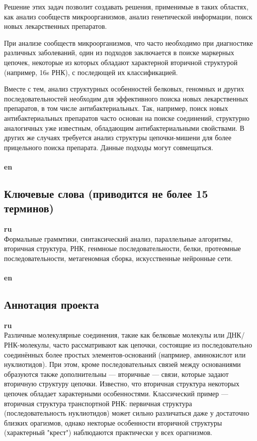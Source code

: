 ﻿\documentclass[12pt]{article}  %
\theoremstyle{remark}
\begin{document}
Решение этих задач позволит создавать решения, применимые в таких областях, как анализ сообществ микроорганизмов, анализ генетической информации, поиск новых лекарственных препаратов.

При анализе сообществ микроорганизмов, что часто необходимо при диагностике различных заболеваний, один из подходов заключается в поиске маркерных цепочек, некоторые из которых обладают характерной вторичной структурой (например, 16s РНК), с последющей их классификацией.

Вместе с тем, анализ структурных особенностей белковых, геномных и других последовательностей необходим для эффективного поиска новых лекарственных препаратов, в том числе антибактериальных. Так, например, поиск новых антибактериальных препаратов часто основан на поиске соединений, структурно аналогичных уже известным, обладающим антибактериальными свойствами. В других же случаях требуется анализ структуры цепочки-мишени для более прицельного поиска препарата. Данные подходы могут совмещаться.
\\
\\
\textbf{en}\\


\subsection{Ключевые слова (приводится не более 15 терминов)}

\textbf{ru}\\
Формальные граммтики, синтаксический анализ, параллельные алгоритмы, вторичная структура, РНК, генмноые последовательности, белки, протеомные последовательности, метагеномная сборка, искусственные нейронные сети.
\\
\\
\textbf{en}\\


\subsection{Аннотация проекта}
\textbf{ru}\\
Различные молекулярные соединения, такие как белковые молекулы или ДНК/РНК-молекулы, часто рассматривают как цепочки, состоящие из последовательно соединённых более простых элементов-оснований (напрмиер, аминокислот или нуклиотидов).
При этом, кроме последовательных связей между основаниями образуются также дополнительны --- вторичные --- связи, которые задают вторичную структуру цепочки.
Известно, что вторичная структура некоторых цепочек обладает характерными особенностями.
Классический пример --- вторичная структура транспортной РНК: первичная структура (последовательность нуклиотидов) может сильно различаться даже у достаточно близких орагизмов, однако некторые особенности вторичной структуры (характерный "крест") наблюдаются практически у всех орагнизмов.
\end{document}
